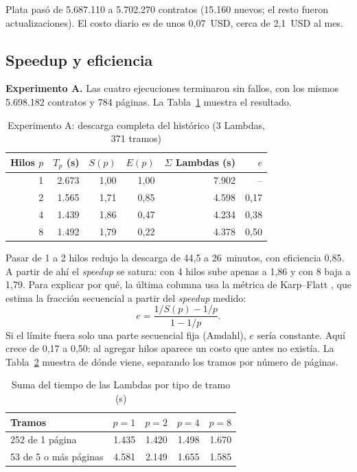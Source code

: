 \documentclass[conference]{IEEEtran}
\begin{document}
Plata pasó de 5.687.110 a 5.702.270 contratos (15.160 nuevos; el resto fueron actualizaciones). El costo diario es de unos 0,07~USD, cerca de 2,1~USD al mes.

\subsection{Speedup y eficiencia}
\textbf{Experimento A.} Las cuatro ejecuciones terminaron sin fallos, con los mismos 5.698.182 contratos y 784 páginas. La Tabla~\ref{tab:mp} muestra el resultado.

\begin{table}[htbp]
\caption{Experimento A: descarga completa del histórico (3 Lambdas, 371 tramos)}
\label{tab:mp}
\centering
\begin{tabular}{@{}rrrrrr@{}}
\toprule
Hilos $p$ & $T_p$ (s) & $S(p)$ & $E(p)$ & $\Sigma$ Lambdas (s) & $e$ \\
\midrule
1 & 2.673 & 1,00 & 1,00 & 7.902 & -- \\
2 & 1.565 & 1,71 & 0,85 & 4.598 & 0,17 \\
4 & 1.439 & 1,86 & 0,47 & 4.234 & 0,38 \\
8 & 1.492 & 1,79 & 0,22 & 4.378 & 0,50 \\
\bottomrule
\end{tabular}
\end{table}

Pasar de 1 a 2 hilos redujo la descarga de 44,5 a 26~minutos, con eficiencia 0,85. A partir de ahí el \textit{speedup} se satura: con 4 hilos sube apenas a 1,86 y con 8 baja a 1,79. Para explicar por qué, la última columna usa la métrica de Karp--Flatt \cite{karpflatt1990}, que estima la fracción secuencial a partir del \textit{speedup} medido:
\begin{equation}
e = \frac{1/S(p) - 1/p}{1 - 1/p}.
\end{equation}
Si el límite fuera solo una parte secuencial fija (Amdahl), $e$ sería constante. Aquí crece de 0,17 a 0,50: al agregar hilos aparece un costo que antes no existía. La Tabla~\ref{tab:granularidad} muestra de dónde viene, separando los tramos por número de páginas.

\begin{table}[htbp]
\caption{Suma del tiempo de las Lambdas por tipo de tramo (s)}
\label{tab:granularidad}
\centering
\begin{tabular}{@{}lrrrr@{}}
\toprule
Tramos & $p=1$ & $p=2$ & $p=4$ & $p=8$ \\
\midrule
252 de 1 página & 1.435 & 1.420 & 1.498 & 1.670 \\
53 de 5 o más páginas & 4.581 & 2.149 & 1.655 & 1.585 \\
\bottomrule
\end{tabular}
\end{table}
\end{document}
